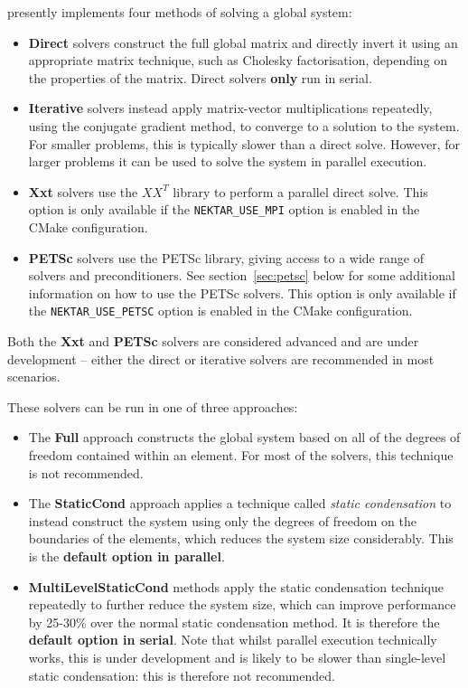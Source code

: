 \nekpp presently implements four methods of solving a global system:

\begin{itemize}
  \item \textbf{Direct} solvers construct the full global matrix and directly
  invert it using an appropriate matrix technique, such as Cholesky
  factorisation, depending on the properties of the matrix. Direct solvers
  \textbf{only} run in serial.
  \item \textbf{Iterative} solvers instead apply matrix-vector multiplications
  repeatedly, using the conjugate gradient method, to converge to a solution to
  the system. For smaller problems, this is typically slower than a direct
  solve. However, for larger problems it can be used to solve the system in
  parallel execution.
  \item \textbf{Xxt} solvers use the $XX^T$ library to perform a parallel direct
  solve. This option is only available if the \texttt{NEKTAR\_USE\_MPI} option
  is enabled in the CMake configuration.
  \item \textbf{PETSc} solvers use the PETSc library, giving access to a wide
  range of solvers and preconditioners. See section~\ref{sec:petsc} below for
  some additional information on how to use the PETSc solvers. This option is
  only available if the \texttt{NEKTAR\_USE\_PETSC} option is enabled in the
  CMake configuration.
\end{itemize}

\begin{warningbox}
Both the \textbf{Xxt} and \textbf{PETSc} solvers are considered advanced and are
under development -- either the direct or iterative solvers are recommended in
most scenarios.
\end{warningbox}

These solvers can be run in one of three approaches:

\begin{itemize}
  \item The \textbf{Full} approach constructs the global system based on all of
  the degrees of freedom contained within an element. For most of the \nekpp
  solvers, this technique is not recommended.
  \item The \textbf{StaticCond} approach applies a technique called \emph{static
    condensation} to instead construct the system using only the degrees of
  freedom on the boundaries of the elements, which reduces the system size
  considerably. This is the \textbf{default option in parallel}.
  \item \textbf{MultiLevelStaticCond} methods apply the static condensation
  technique repeatedly to further reduce the system size, which can improve
  performance by 25-30\% over the normal static condensation method. It is
  therefore the \textbf{default option in serial}. Note that whilst parallel
  execution technically works, this is under development and is likely to be
  slower than single-level static condensation: this is therefore not
  recommended.
\end{itemize}

